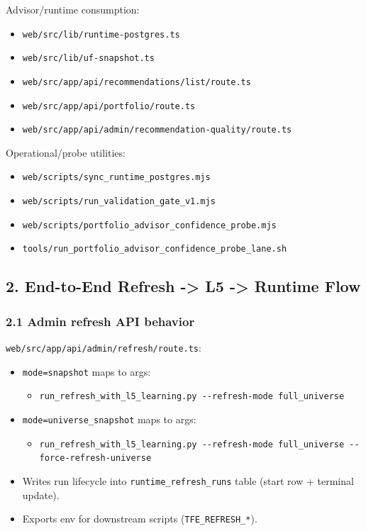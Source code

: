 \documentclass[
]{article}
\providecommand{\tightlist}{%
  \setlength{\itemsep}{0pt}\setlength{\parskip}{0pt}}
\begin{document}
Advisor/runtime consumption:

\begin{itemize}
\tightlist
\item
  \texttt{web/src/lib/runtime-postgres.ts}
\item
  \texttt{web/src/lib/uf-snapshot.ts}
\item
  \texttt{web/src/app/api/recommendations/list/route.ts}
\item
  \texttt{web/src/app/api/portfolio/route.ts}
\item
  \texttt{web/src/app/api/admin/recommendation-quality/route.ts}
\end{itemize}

Operational/probe utilities:

\begin{itemize}
\tightlist
\item
  \texttt{web/scripts/sync\_runtime\_postgres.mjs}
\item
  \texttt{web/scripts/run\_validation\_gate\_v1.mjs}
\item
  \texttt{web/scripts/portfolio\_advisor\_confidence\_probe.mjs}
\item
  \texttt{tools/run\_portfolio\_advisor\_confidence\_probe\_lane.sh}
\end{itemize}

\subsection{2. End-to-End Refresh -\textgreater{} L5 -\textgreater{}
Runtime Flow}\label{2-end-to-end-refresh---l5---runtime-flow}

\subsubsection{2.1 Admin refresh API
behavior}\label{21-admin-refresh-api-behavior}

\texttt{web/src/app/api/admin/refresh/route.ts}:

\begin{itemize}
\tightlist
\item
  \texttt{mode=snapshot} maps to args:

  \begin{itemize}
  \tightlist
  \item
    \texttt{run\_refresh\_with\_l5\_learning.py\ -\/-refresh-mode\ full\_universe}
  \end{itemize}
\item
  \texttt{mode=universe\_snapshot} maps to args:

  \begin{itemize}
  \tightlist
  \item
    \texttt{run\_refresh\_with\_l5\_learning.py\ -\/-refresh-mode\ full\_universe\ -\/-force-refresh-universe}
  \end{itemize}
\item
  Writes run lifecycle into \texttt{runtime\_refresh\_runs} table (start
  row + terminal update).
\item
  Exports env for downstream scripts (\texttt{TFE\_REFRESH\_*}).
\end{itemize}
\end{document}
